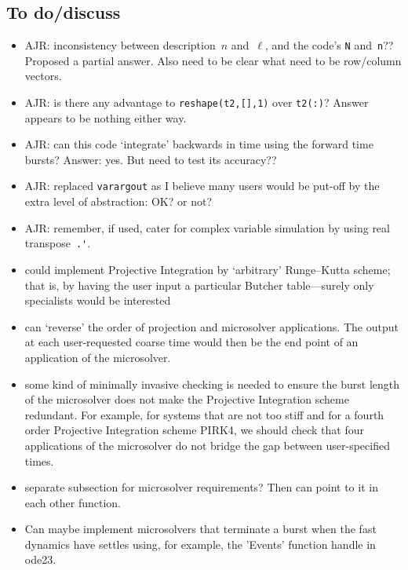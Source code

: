 \subsection{To do/discuss}
\begin{itemize}
\item AJR: inconsistency between description~\(n\) and~\(\ell\), and the code's \verb|N| and~\verb|n|??  Proposed a partial answer.  Also need to be clear what need to be row/column vectors.
\item AJR: is there any advantage to \verb|reshape(t2,[],1)| over \verb|t2(:)|?  Answer appears to be nothing either way.
\item AJR: can this code `integrate' backwards in time using the forward time bursts? Answer: yes. But need to test its accuracy??
\item AJR: replaced \verb|varargout| as I believe many users would be put-off by the extra level of abstraction:  OK? or not?
\item AJR: remember, if used, cater for complex variable simulation by using real transpose~\verb|.'|.
\item could implement Projective Integration by `arbitrary' Runge--Kutta scheme; that is, by having the user input a particular Butcher table---surely only specialists would be interested
\item can `reverse' the order of projection and microsolver applications.
The output at each user-requested coarse time would then be the end point of an application of the microsolver.
\item some kind of minimally invasive checking is needed to ensure the burst length of the microsolver does not make the Projective Integration scheme redundant.
For example, for systems that are not too stiff and for a fourth order Projective Integration scheme PIRK4, we should check that four applications of the microsolver do not bridge the gap between user-specified times.
\item separate subsection for microsolver requirements? 
Then can point to it in each other function.
\item Can maybe implement microsolvers that terminate a burst when the fast dynamics have settles using, for example, the 'Events' function handle in ode23. 
\end{itemize}

